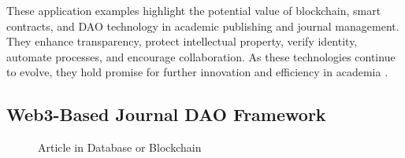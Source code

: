 \documentclass[lettersize,journal]{IEEEtran}
\begin{document}
These application examples highlight the potential value of blockchain, smart contracts, and DAO technology in academic publishing and journal management. They enhance transparency, protect intellectual property, verify identity, automate processes, and encourage collaboration. As these technologies continue to evolve, they hold promise for further innovation and efficiency in academia \cite{vacca2021systematic}.

\subsection{Web3-Based Journal DAO Framework}

\begin{figure}[h!]
  \centering
  \hfil
  \caption{Article in Database or Blockchain}
  \label{fig:storage}
\end{figure}
\end{document}
